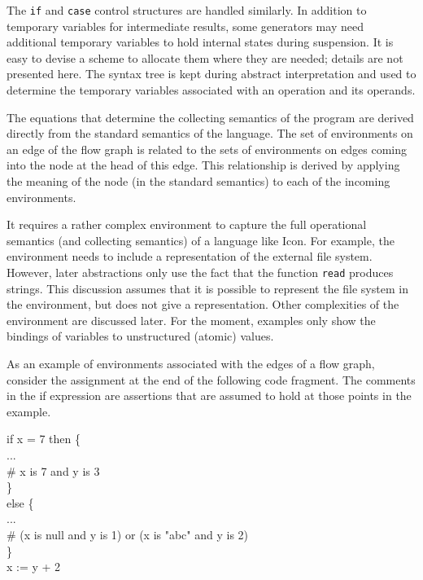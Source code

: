 The \texttt{if} and \texttt{case} control structures are handled
similarly. In addition to temporary variables for intermediate
results, some generators may need additional temporary variables to
hold internal states during suspension. It is easy to devise a scheme
to allocate them where they are needed; details are not presented
here. The syntax tree is kept during abstract interpretation and used
to determine the temporary variables associated with an operation and
its operands.

The equations that determine the collecting semantics of the program
are derived directly from the standard semantics of the language. The
set of environments on an edge of the flow graph is related to the
sets of environments on edges coming into the node at the head of this
edge. This relationship is derived by applying the meaning of the node
(in the standard semantics) to each of the incoming environments.

It requires a rather complex environment to capture the full
operational semantics (and collecting semantics) of a language like
Icon. For example, the environment needs to include a representation
of the external file system.  However, later abstractions only use the
fact that the function \texttt{read} produces strings. This discussion
assumes that it is possible to represent the file system in the
environment, but does not give a representation. Other complexities of
the environment are discussed later. For the moment, examples only
show the bindings of variables to unstructured (atomic) values.

As an example of environments associated with the edges of a flow
graph, consider the assignment at the end of the following code
fragment. The comments in the if expression are assertions that are
assumed to hold at those points in the example.

\goodbreak
\begin{iconcode}
\>if x = 7 then \{\\
\>\>...\\
\>\>\# x is 7 and y is 3\\
\>\>\}\\
\>else \{\\
\>\>...\\
\>\>\# (x is null and y is 1) or (x is "abc" and y is 2)\\
\>\>\}\\
\>x := y + 2\\
\end{iconcode}


